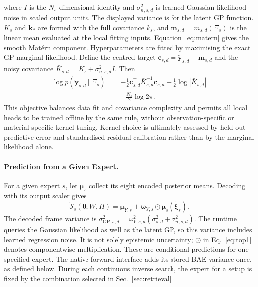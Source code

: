 where $I$ is the $N_s$-dimensional identity and
$\sigma_{n,s,d}^2$ is learned Gaussian likelihood noise in scaled
output units. The displayed variance is for the latent GP function.
$K_s$ and $\mathbf{k}_*$ are formed with the full covariance
$k_s$, and $\mathbf{m}_{s,d}=m_{s,d}(\Xi_s)$ is the linear mean evaluated
at the local fitting inputs.  Equation~\eqref{eq:matern} gives the
smooth Mat\'ern component.
Hyperparameters are fitted by maximising the exact GP marginal
likelihood. Define the centred target
$\mathbf{c}_{s,d}=\tilde{\mathbf{y}}_{s,d}-\mathbf{m}_{s,d}$ and the
noisy covariance $\bar K_{s,d}=K_s+\sigma_{n,s,d}^{2}I$. Then
\begin{equation}
\label{eq:gp-mll}
\begin{aligned}
    \log p(\tilde{\mathbf{y}}_{s,d}\mid \Xi_s)
    ={}&-\tfrac{1}{2}\mathbf{c}_{s,d}^{\top}
      \bar K_{s,d}^{-1}\mathbf{c}_{s,d}
      -\tfrac{1}{2}\log|\bar K_{s,d}| \\
      &-\tfrac{N_s}{2}\log 2\pi .
\end{aligned}
\end{equation}
This objective balances data fit and covariance complexity and permits
all local heads to be trained offline by the same rule, without
observation-specific or material-specific kernel tuning.  Kernel choice
is ultimately assessed by held-out predictive error and standardised
residual calibration rather than by the marginal likelihood alone.

\paragraph{Prediction from a Given Expert.}
\label{sec:surr-top1}
For a given expert $s$, let $\boldsymbol\mu_s$ collect its eight encoded
posterior means. Decoding with its output scaler gives
\begin{equation}
\label{eq:top1}
    \tilde{\mathcal S}_s(\boldsymbol\theta;W,H)
    =\boldsymbol\mu_{Y,s}
     +\boldsymbol\omega_{Y,s}\odot
       \boldsymbol\mu_s(\tilde{\boldsymbol\xi}_s).
\end{equation}
The decoded frame variance is
$\sigma_{\mathrm{GP},s,d}^{2}=\omega_{Y,s,d}^{2}
(\sigma_{s,d}^{2}+\sigma_{n,s,d}^{2})$. The runtime queries the
Gaussian likelihood as well as the latent GP, so this variance includes
learned regression noise. It is not solely epistemic uncertainty;
$\odot$ in Eq.~\eqref{eq:top1} denotes componentwise multiplication.
These are conditional predictions for one specified expert. The native
forward interface adds its stored BAE variance once, as defined below.
During each continuous inverse search, the expert for a setup is fixed
by the combination selected in Sec.~\ref{sec:retrieval}.



